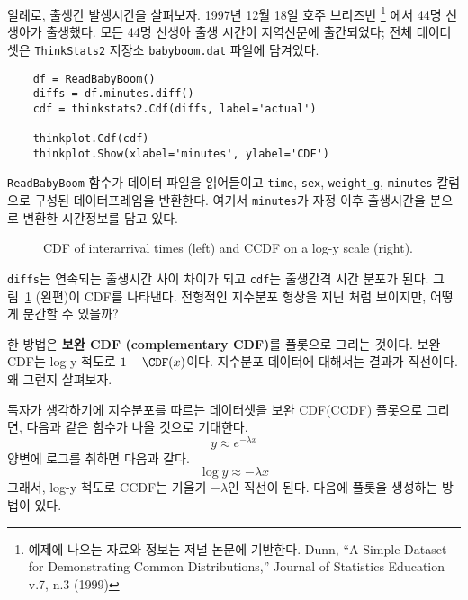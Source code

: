 일례로, 출생간 발생시간을 살펴보자. 1997년 12월 18일 호주 브리즈번
\footnote{예제에 나오는 자료와 정보는 저널 논문에 기반한다. Dunn, ``A Simple Dataset for Demonstrating Common Distributions,'' Journal of Statistics Education v.7, n.3 (1999)}
에서 44명 신생아가 출생했다. 모든 44명 신생아 출생 시간이 지역신문에 출간되었다;
전체 데이터셋은 {\tt ThinkStats2} 저장소 {\tt babyboom.dat} 파일에 담겨있다.

\begin{verbatim}
    df = ReadBabyBoom()
    diffs = df.minutes.diff()
    cdf = thinkstats2.Cdf(diffs, label='actual')

    thinkplot.Cdf(cdf)
    thinkplot.Show(xlabel='minutes', ylabel='CDF')
\end{verbatim}

{\tt ReadBabyBoom} 함수가 데이터 파일을 읽어들이고 {\tt time}, {\tt sex}, \verb"weight_g", {\tt minutes}
칼럼으로 구성된 데이터프레임을 반환한다.
여기서 {\tt minutes}가 자정 이후 출생시간을 분으로 변환한 시간정보를 담고 있다.

\begin{figure}
\caption{CDF of interarrival times (left) and CCDF on a log-y scale (right).}
\label{analytic_interarrival_cdf}
\end{figure}


{\tt diffs}는 연속되는 출생시간 사이 차이가 되고 
{\tt cdf}는 출생간격 시간 분포가 된다.
그림~\ref{analytic_interarrival_cdf} (왼편)이 CDF를 나타낸다.
전형적인 지수분포 형상을 지닌 처럼 보이지만, 어떻게 분간할 수 있을까?

한 방법은 {\bf 보완 CDF (complementary CDF)}를 플롯으로 그리는 것이다.
보완 CDF는 log-y 척도로 $1 - \CDF(x)$이다.
지수분포 데이터에 대해서는 결과가 직선이다. 왜 그런지 살펴보자.


독자가 생각하기에 지수분포를 따르는 데이터셋을 보완 CDF(CCDF) 플롯으로 그리면, 
다음과 같은 함수가 나올 것으로 기대한다.
%
\[ y \approx e^{-\lambda x} \]
%
양변에 로그를 취하면 다음과 같다.
%
\[ \log y \approx -\lambda x\]
%
그래서, log-y 척도로 CCDF는 기울기 $-\lambda$인 직선이 된다.
다음에 플롯을 생성하는 방법이 있다.


